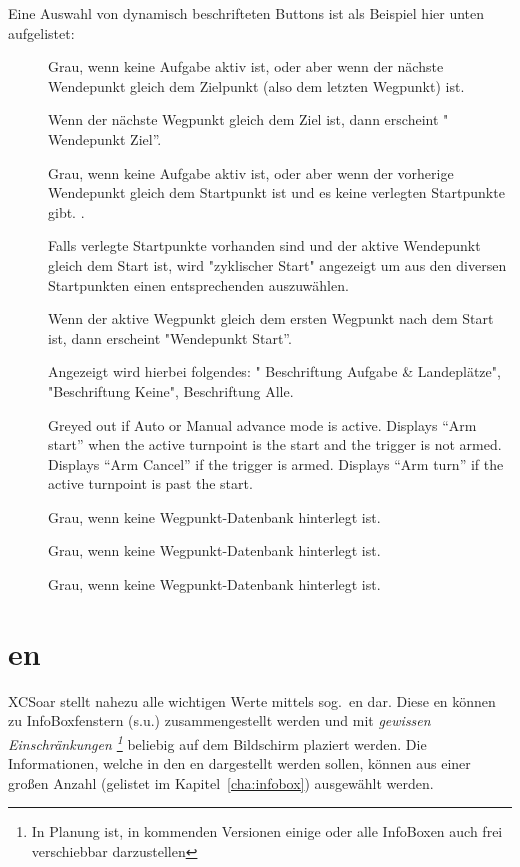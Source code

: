 Eine Auswahl von dynamisch beschrifteten Buttons ist als Beispiel hier unten aufgelistet:

\begin{description}
\item[]
  Grau, wenn keine  Aufgabe aktiv ist, oder aber wenn der nächste Wendepunkt gleich dem Zielpunkt (also dem letzten Wegpunkt) ist.

 Wenn der nächste Wegpunkt gleich dem Ziel ist, dann erscheint " Wendepunkt Ziel''.
\item[]
  Grau, wenn keine  Aufgabe aktiv ist, oder aber wenn der vorherige Wendepunkt gleich dem Startpunkt ist und es keine verlegten Startpunkte gibt. .

  Falls verlegte Startpunkte vorhanden sind und der aktive Wendepunkt gleich dem Start ist, wird "zyklischer Start" angezeigt um aus den diversen Startpunkten einen entsprechenden auszuwählen.

Wenn der aktive Wegpunkt gleich dem ersten Wegpunkt nach dem Start ist, dann erscheint  "Wendepunkt Start''.
\item[]
Angezeigt wird hierbei folgendes: " Beschriftung Aufgabe \& Landeplätze", "Beschriftung Keine", Beschriftung Alle.

\item[]
  Greyed out if Auto or Manual advance mode is active. Displays ``Arm
  start'' when the active turnpoint is the start and the trigger is
  not armed. Displays ``Arm Cancel'' if the trigger is armed.
  Displays ``Arm turn'' if the active turnpoint is past the start.
\item[]
 Grau,  wenn keine Wegpunkt-Datenbank hinterlegt ist.
 \item[]
  Grau,  wenn keine Wegpunkt-Datenbank hinterlegt ist.
\item[]
  Grau,  wenn keine Wegpunkt-Datenbank hinterlegt ist.
\end{description}

\section{{\InfoBox}en}

\textsf{XCSoar} stellt nahezu alle wichtigen Werte mittels  sog.\  {\InfoBox}en dar.
Diese {\InfoBox}en können zu InfoBoxfenstern (s.u.) zusammengestellt werden und mit
\emph{gewissen Einschränkungen \footnote{In Planung ist, in kommenden Versionen einige oder alle
InfoBoxen auch frei verschiebbar darzustellen}} beliebig auf dem Bildschirm plaziert werden.
Die Informationen, welche in den  {\InfoBox}en dargestellt werden sollen,  können aus einer großen Anzahl (gelistet im Kapitel~\ref{cha:infobox}) ausgewählt werden.

